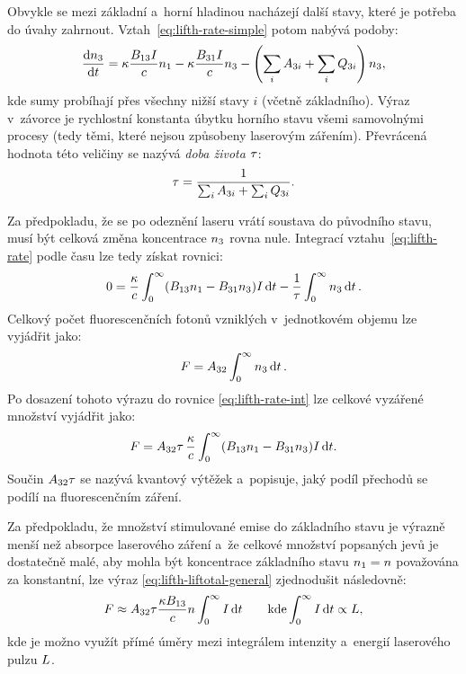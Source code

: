 Obvykle se mezi základní a~horní hladinou nacházejí další stavy,
které je potřeba do úvahy zahrnout.
Vztah~\eqref{eq:lifth-rate-simple} potom nabývá podoby:
\begin{equation}
	\label{eq:lifth-rate}
	\dv{n_3}{t}
	= \kappa \frac{B_{13} I}{c} n_1
	- \kappa \frac{B_{31} I}{c} n_3
	- \left( \sum_i A_{3i} + \sum_i Q_{3i} \right) n_3,
\end{equation}
kde sumy probíhají přes všechny nižší stavy $i$ (včetně základního).
Výraz v~závorce je rychlostní konstanta úbytku horního stavu všemi
samovolnými procesy (tedy těmi, které nejsou způsobeny laserovým zářením).
Převrácená hodnota této veličiny se nazývá \emph{doba života} $\tau$:
\begin{equation}
	\label{eq:lifth-lifetime-def}
	\tau = \frac{1}{\sum_i A_{3i} + \sum_i Q_{3i}}.
\end{equation}

Za předpokladu, že se po odeznění laseru vrátí soustava do původního stavu,
musí být celková změna koncentrace $n_3$ rovna nule.
Integrací vzta\-hu~\eqref{eq:lifth-rate} podle času lze tedy získat rovnici:
\begin{equation}
	\label{eq:lifth-rate-int}
	0 = \frac{\kappa}{c}
	\int_0^\infty (B_{13} n_1 - B_{31} n_3) I\,\dd t
	- \frac1{\tau} \int_0^\infty n_3 \dd{t}.
\end{equation}
Celkový počet fluorescenčních fotonů vzniklých v~jednotkovém objemu
lze vyjádřit jako:
\begin{equation}
	\label{eq:lifth-liftotal-def}
	F = A_{32} \int_0^\infty n_3 \dd{t}.
\end{equation}
Po dosazení tohoto výrazu do rovnice \eqref{eq:lifth-rate-int}
lze celkové vyzářené množství vyjádřit jako:
\begin{equation}
	\label{eq:lifth-liftotal-general}
	F = A_{32} \tau \, \frac{\kappa}{c}
	\int_0^\infty
	(B_{13} n_1 - B_{31} n_3)
	I\,\dd t.
\end{equation}
Součin $A_{32} \tau$ se nazývá kvantový výtěžek a~popisuje,
jaký podíl přechodů se podílí na fluorescenčním záření.

Za předpokladu, že množství stimulované emise do základního stavu
je výrazně menší než absorpce laserového záření
a~že celkové množství popsaných jevů je dostatečně malé, aby mohla být
koncentrace základního stavu $n_1 = n$ považována za konstantní,
lze výraz \eqref{eq:lifth-liftotal-general} zjednodušit následovně:
\begin{equation}
	\label{eq:lifth-liftotal-linear}
	F \approx A_{32} \tau
	\frac{\kappa B_{13}}{c}
	n
	\int_0^\infty I\,\dd t
	\qquad
	\text{kde} \int_0^\infty I\,\dd t \propto L,
\end{equation}
kde je možno využít přímé úměry mezi integrálem intenzity
a~energií laserového pulzu $L$.

